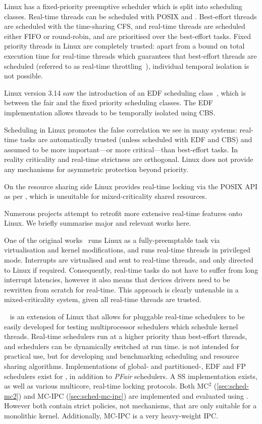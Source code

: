 Linux has a fixed-priority preemptive scheduler which is split into scheduling classes.  Real-time
threads can be scheduled with \gls{POSIX} \schedfifo and \schedsporadic. Best-effort threads are
scheduled with the time-sharing \gls{CFS}, and real-time threads are scheduled either \gls{FIFO} or round-robin, and
are prioritised over the best-effort tasks.  Fixed priority threads in Linux are completely trusted:
apart from a bound on total execution time for real-time threads which guarantees that best-effort
threads are scheduled (referred to as real-time throttling~\citep{Corbet_08}), individual temporal
isolation is not possible.

Linux version 3.14 saw the introduction of an \gls{EDF} scheduling class~\citep{Corbet_09},
which is between the fair and the fixed priority scheduling classes.  The \gls{EDF} implementation
allows threads to be temporally isolated using \gls{CBS}.

Scheduling in Linux promotes the false correlation we see in many systems: real-time tasks are
automatically trusted (unless scheduled with \gls{EDF} and \gls{CBS}) and assumed to be more important---or more
critical---than best-effort tasks.  In reality criticality and real-time strictness are orthogonal.
Linux does not provide any mechanisms for asymmetric protection beyond priority.

On the resource sharing side Linux provides real-time locking via the \gls{POSIX} API as per
, which is unsuitable for mixed-criticality shared resources.

Numerous projects attempt to retrofit more extensive real-time features onto
Linux.  We briefly summarise major and relevant works here. 

One of the original
works~\citep{Yodaiken_Barabanov_97} runs Linux as a fully-preemptable task via virtualisation and
kernel modifications, and runs real-time threads in privileged mode. Interrupts are virtualised and
sent to real-time threads, and only directed to
Linux if required. Consequently, real-time tasks do not have to suffer from long interrupt
latencies, however it also means that devices drivers need to be rewritten from scratch for
real-time. This approach is clearly untenable in a mixed-criticality system, given all real-time
threads are trusted. 

\litmus~\citep{Calandrino_LBDA_06} is an extension of Linux that allows for pluggable real-time
schedulers to be easily developed for testing multiprocessor schedulers which schedule kernel
threads. Real-time schedulers run at a higher priority than best-effort threads, and schedulers can
be dynamically switched at run time. \litmus is not intended for
practical use, but for developing and benchmarking scheduling and resource sharing algorithms.
Implementations of global- and partitioned-, EDF and FP schedulers exist for \litmus, in addition to
\emph{PFair} schedulers. A \gls{SS} implementation exists, as well as various multicore,
real-time locking protocols.
Both MC$^2$ (\cref{sec:sched-mc2}) and MC-IPC (\cref{sec:sched-mc-ipc}) are implemented
and evaluated using \litmus. However both contain strict policies, not mechanisms, that are only
suitable for a monolithic kernel. Additionally, MC-IPC is a very heavy-weight \gls{IPC}. 

